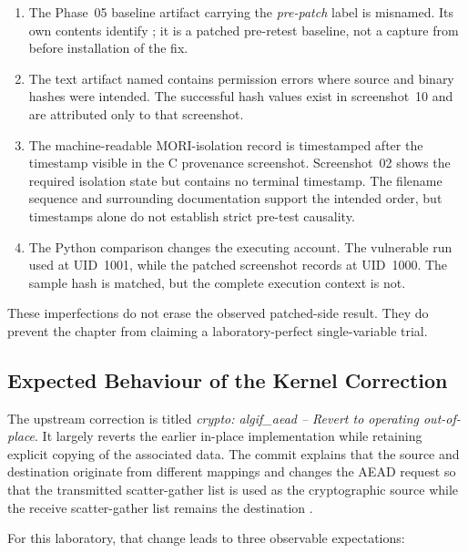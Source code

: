 \begin{enumerate}
    \item The Phase~05 baseline artifact carrying the \emph{pre-patch} label is
    misnamed. Its own contents identify ; it is a
    patched pre-retest baseline, not a capture from before installation of the
    fix.

    \item The text artifact named
     contains permission errors
    where source and binary hashes were intended. The successful hash values
    exist in screenshot~10 and are attributed only to that screenshot.

    \item The machine-readable MORI-isolation record is timestamped after the
    timestamp visible in the C provenance screenshot. Screenshot~02 shows the
    required isolation state but contains no terminal timestamp. The filename
    sequence and surrounding documentation support the intended order, but
    timestamps alone do not establish strict pre-test causality.

    \item The Python comparison changes the executing account. The vulnerable
    run used  at UID~1001, while the patched screenshot records
     at UID~1000. The sample hash is matched, but the complete
    execution context is not.
\end{enumerate}

These imperfections do not erase the observed patched-side result. They do
prevent the chapter from claiming a laboratory-perfect single-variable trial.

\subsection{Expected Behaviour of the Kernel Correction}

The upstream correction is titled \emph{crypto: algif\_aead -- Revert to
operating out-of-place}. It largely reverts the earlier in-place implementation
while retaining explicit copying of the associated data. The commit explains
that the source and destination originate from different mappings and changes
the AEAD request so that the transmitted scatter-gather list is used as the
cryptographic source while the receive scatter-gather list remains the
destination \cite{linux-copyfail-fix}.

For this laboratory, that change leads to three observable expectations:

